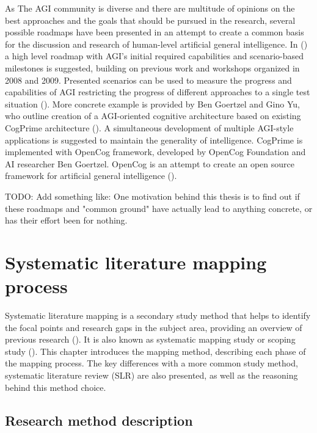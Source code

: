 \documentclass[utf8,english]{gradu3}
\begin{document}
As The AGI community is diverse and there are multitude of opinions on the best
approaches and the goals that should be pursued in the research, several
possible roadmaps have been presented in an attempt to create a common basis for
the discussion and research of human-level artificial general intelligence. In
(\cite{adams2012}) a high level roadmap with AGI's initial required capabilities
and scenario-based milestones is suggested, building on previous work and
workshops organized in 2008 and 2009. Presented scenarios can be used to measure
the progress and capabilities of AGI restricting the progress of different
approaches to a single test situation (\cite{adams2012}). More concrete example
is provided by Ben Goertzel and Gino Yu, who outline creation of a AGI-oriented
cognitive architecture based on existing CogPrime architecture
(\cite{goertzel2014map}). A simultaneous development of multiple AGI-style
applications is suggested to maintain the generality of intelligence. CogPrime
is implemented with OpenCog framework, developed by OpenCog Foundation and AI
researcher Ben Goertzel. OpenCog is an attempt to create an open source
framework for artificial general intelligence
(\cite{opencogwiki,goertzel2012cog}).

TODO: Add something like: One motivation behind this thesis is to find out if
these roadmaps and "common ground" have actually lead to anything concrete, or
has their effort been for nothing.


\chapter{Systematic literature mapping process}


\label{method}

Systematic literature mapping is a secondary study method that helps to identify
the focal points and research gaps in the subject area, providing an overview of
previous research (\cite{petersen2008}). It is also known as systematic mapping
study or scoping study (\cite{kitchenham2007}). This chapter introduces the mapping
method, describing each phase of the mapping process. The key differences with
a more common study method, systematic literature review (SLR) are also
presented, as well as the reasoning behind this method choice.

\section{Research method description}
\end{document}
